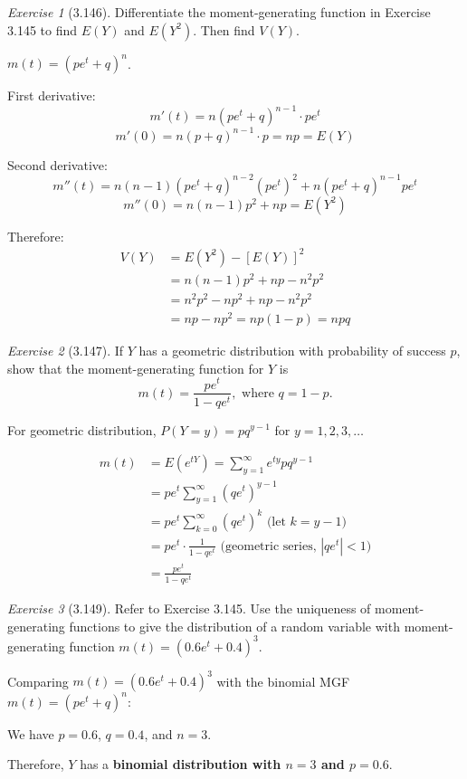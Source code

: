 \documentclass[12pt]{amsart}
\makeatletter
\theoremstyle{remark}
\newtheorem*{exercise}{Exercise}%
\renewenvironment{proof}[1][\proofname]{\par\doublespacing
  \pushQED{\qed}%
  \normalfont \topsep6\p@\@plus6\p@\relax
  \list{}{%
    \settowidth{\leftmargin}{\itshape\proofname:\hskip\labelsep}%
    \setlength{\labelwidth}{0pt}%
    \setlength{\itemindent}{-\leftmargin}%
  }%
  \item[\hskip\labelsep\itshape#1\@addpunct{:}]\ignorespaces
}{%
  \popQED\endlist\@endpefalse
  \singlespacing
}
\theoremstyle{mycomment}
\makeatother
\begin{document}
\begin{exercise}[3.146]
Differentiate the moment-generating function in Exercise 3.145 to find $E(Y)$ and $E(Y^2)$. Then find $V(Y)$.

\begin{proof}[Solution]
$m(t) = (pe^t + q)^n$.
	
	First derivative:
	$$m'(t) = n(pe^t + q)^{n-1} \cdot pe^t$$
	$$m'(0) = n(p + q)^{n-1} \cdot p = np = E(Y)$$
	
	Second derivative:
	$$m''(t) = n(n-1)(pe^t + q)^{n-2}(pe^t)^2 + n(pe^t + q)^{n-1}pe^t$$
	$$m''(0) = n(n-1)p^2 + np = E(Y^2)$$
	
	Therefore:
	\begin{align*}
		V(Y) &= E(Y^2) - [E(Y)]^2 \\
		&= n(n-1)p^2 + np - n^2p^2 \\
		&= n^2p^2 - np^2 + np - n^2p^2 \\
		&= np - np^2 = np(1-p) = npq
  \end{align*}
\end{proof}
\end{exercise}

\begin{exercise}[3.147]
If $Y$ has a geometric distribution with probability of success $p$, show that the moment-generating function for $Y$ is
$$m(t) = \frac{pe^t}{1 - qe^t}, \text{ where } q = 1 - p.$$

\begin{proof}[Solution]
 For geometric distribution, $P(Y = y) = pq^{y-1}$ for $y = 1, 2, 3, \ldots$
	
	\begin{align*}
		m(t) &= E(e^{tY}) = \sum_{y=1}^{\infty} e^{ty} pq^{y-1} \\
		&= pe^t \sum_{y=1}^{\infty} (qe^t)^{y-1} \\
		&= pe^t \sum_{k=0}^{\infty} (qe^t)^k \text{ (let } k = y-1) \\
		&= pe^t \cdot \frac{1}{1 - qe^t} \text{ (geometric series, } |qe^t| < 1) \\
		&= \frac{pe^t}{1 - qe^t}
	\end{align*}
\end{proof}
\end{exercise}

\begin{exercise}[3.149]
Refer to Exercise 3.145. Use the uniqueness of moment-generating functions to give the distribution of a random variable with moment-generating function $m(t) = (0.6e^t + 0.4)^3$.

\begin{proof}[Solution]
 Comparing $m(t) = (0.6e^t + 0.4)^3$ with the binomial MGF $m(t) = (pe^t + q)^n$:
	
	We have $p = 0.6$, $q = 0.4$, and $n = 3$.
	
	Therefore, $Y$ has a \textbf{binomial distribution with $n = 3$ and $p = 0.6$}.
\end{proof}
\end{exercise}
\end{document}
